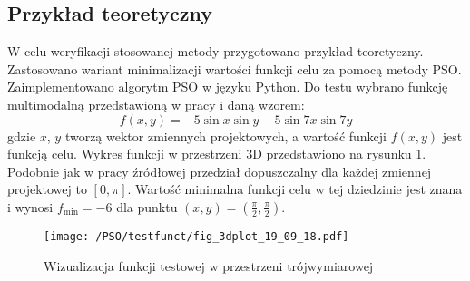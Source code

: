 \subsection{Przykład teoretyczny} \label{sect: pso_single_teor_exampl}
W celu weryfikacji stosowanej metody przygotowano przykład teoretyczny. Zastosowano wariant minimalizacji wartości funkcji celu za pomocą metody PSO. Zaimplementowano algorytm PSO w języku Python. Do testu wybrano funkcję multimodalną przedstawioną w pracy \parencite{Tesch2016} i daną wzorem:
\begin{equation} \label{eq: pso_test_func}
	f(x,y) = -5\sin{x}\sin{y}-5\sin{7x}\sin{7y}
\end{equation}
gdzie $x$, $y$ tworzą wektor zmiennych projektowych, a wartość funkcji $f(x,y)$ jest funkcją celu. Wykres funkcji w przestrzeni 3D przedstawiono na rysunku \ref{fig: pso_example_function}. Podobnie jak w pracy źródłowej przedział dopuszczalny dla każdej zmiennej projektowej to $[0,\pi]$. Wartość minimalna funkcji celu w tej dziedzinie jest znana i wynosi $f_{\text{min}}=-6$ dla punktu $(x,y)=(\frac{\pi}{2},\frac{\pi}{2})$.
\begin{figure}[h]
	\centering
	\texttt{[image: /PSO/testfunct/fig\_3dplot\_19\_09\_18.pdf]} 
	\captionsetup{justification=centering}
	\caption{Wizualizacja funkcji testowej w przestrzeni trójwymiarowej}
	\label{fig: pso_example_function}
\end{figure}

